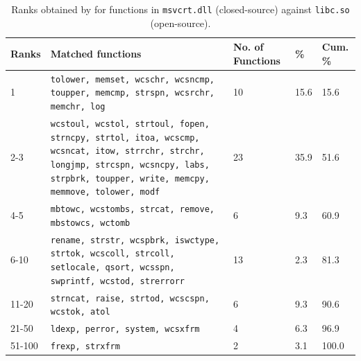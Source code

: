 \begin{appendices}
\begin{table}[!ht]
\begin{center}
\caption{Ranks obtained by \tool for functions in \texttt{msvcrt.dll} (closed-source) against \texttt{libc.so} (open-source). \\}
		\label{tab:msvcrt_libc}
		\scriptsize
\begin{tabular}{|m{0.8cm}|m{12cm}|m{0.7cm}|m{0.7cm}|m{0.7cm}|}
\hline
	Ranks & Matched functions & No. of Functions & \% & Cum. \% \\ \hline
	1 & \texttt{tolower, memset, wcschr, wcsncmp, toupper, memcmp, strspn, wcsrchr, memchr, log} & 10 & 15.6 &  15.6\\ \hline
	2-3 & \texttt{wcstoul, wcstol, strtoul, fopen, strncpy, strtol, itoa, wcscmp, wcsncat, itow, strrchr, strchr, longjmp, strcspn, wcsncpy, labs, strpbrk, toupper, write, memcpy, memmove, tolower, modf} & 23 & 35.9 & 51.6 \\ \hline
	4-5 & \texttt{mbtowc, wcstombs, strcat, remove, mbstowcs, wctomb} & 6 & 9.3 & 60.9 \\ \hline
	6-10 & \texttt{rename, strstr, wcspbrk, iswctype, strtok, wcscoll, strcoll, setlocale, qsort, wcsspn, swprintf, wcstod, strerrorr} & 13 & 2.3 &  81.3\\ \hline
	11-20 & \texttt{strncat, raise, strtod, wcscspn, wcstok, atol} & 6 & 9.3 &  90.6\\ \hline
	21-50 & \texttt{ldexp, perror, system, wcsxfrm} & 4 & 6.3 & 96.9 \\ \hline
	51-100 & \texttt{frexp, strxfrm} & 2 & 3.1 & 100.0 \\ \hline
\end{tabular}
\end{center}
\end{table}



\end{appendices}


